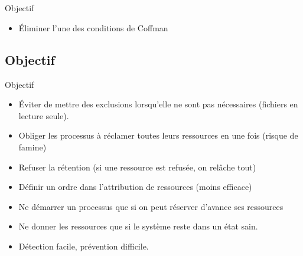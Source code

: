 \section{\sectitle}
\begin{frame}{\sectitle}
    \def\subsectitle{Objectif}

    \begin{alertblock}{\subsectitle}
        \begin{itemize}
            \item Éliminer l'une des conditions de Coffman
        \end{itemize}
    \end{alertblock}


    \subsection{\subsectitle}
    \begin{block}{\subsectitle}
        \begin{itemize}
            \item Éviter de mettre des exclusions lorsqu'elle ne sont pas nécessaires
                (fichiers en lecture seule).
            \item Obliger les processus à réclamer toutes leurs ressources en une fois
                (risque de famine)
            \item Refuser la rétention (si une ressource est refusée, on relâche tout)
            \item Définir un ordre dans l'attribution de ressources (moins efficace)
            \item Ne démarrer un processus que si on peut réserver d'avance ses
                ressources
            \item Ne donner les ressources que si le système reste dans un état sain.
            \item Détection facile, prévention difficile.
        \end{itemize}
    \end{block}
\end{frame}


\def\sectitle{Algorithme du Banquier}
